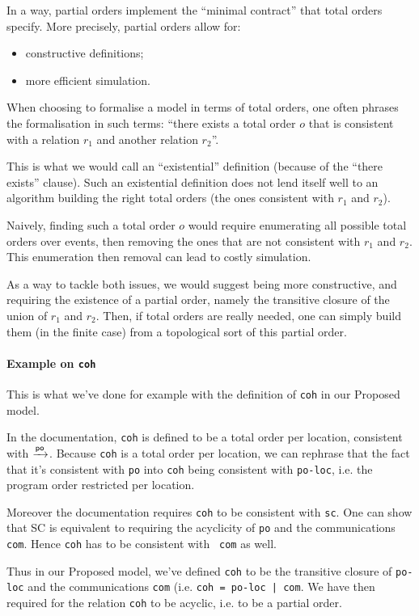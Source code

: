 \documentclass[a4paper]{article}
\begin{document}
{In a way, partial orders implement the ``minimal contract'' that total orders
specify. More precisely, partial orders allow for:
\begin{itemize}
\item constructive definitions;
\item more efficient simulation.
\end{itemize} 

When choosing to formalise a model in terms of total orders, one often phrases
the formalisation in such terms: ``there exists a total order $o$ that is
consistent with a relation $r_1$ and another relation $r_2$''.

This is what we would call an ``existential'' definition (because of the
``there exists'' clause).  Such an existential definition does not lend itself
well to an algorithm building the right total orders (the ones consistent with
$r_1$ and $r_2$).  

Naively, finding such a total order $o$ would require enumerating all possible
total orders over events, then removing the ones that are not consistent with
$r_1$ and $r_2$. This enumeration then removal can lead to costly simulation. 

As a way to tackle both issues, we would suggest being more constructive, and
requiring the existence of a partial order, namely the transitive closure of
the union of $r_1$ and $r_2$. Then, if total orders are really needed, one can
simply build them (in the finite case) from a topological sort of this partial
order. 

\paragraph{Example on {\tt coh}}

This is what we've done for example with the definition of {\tt coh} in
our Proposed model. 

In the documentation, {\tt coh} is defined to be a total order
per location, consistent with $\xrightarrow{\textsf{\scriptsize{}po}}$. Because {\tt coh} is a total order per
location, we can rephrase that the fact that it's consistent with {\tt po} into
{\tt coh} being consistent with {\tt po-loc}, i.e. the program order restricted
per location. 

Moreover the documentation requires {\tt coh} to be consistent with {\tt sc}.
One can show that SC is equivalent to requiring the acyclicity of {\tt po} and
the communications {\tt com}. Hence {\tt coh} has to be consistent with {\tt
com} as well. 

Thus in our Proposed model, we've defined {\tt coh} to be the transitive
closure of {\tt po-loc} and the communications {\tt com} (i.e.  {\tt coh =
po-loc | com}. We have then required for the relation {\tt coh} to be acyclic,
i.e. to be a partial order.

}
\end{document}
